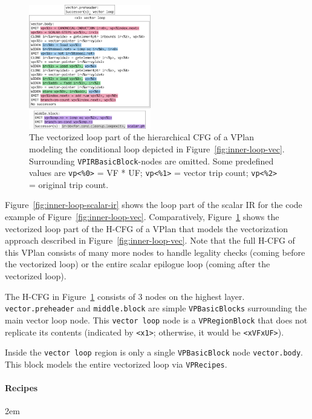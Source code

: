 \documentclass[sigplan,11pt,nonacm]{acmart}
\begin{document}
\begin{figure}
  \centering
  \includegraphics[width=0.475\textwidth]{images/inner-loop-vplan-hcfg-loop-body-color.png}
  \caption{The vectorized loop part of the hierarchical CFG of a VPlan modeling the 
  conditional loop depicted in Figure~\ref{fig:inner-loop-vec}. 
  Surrounding \texttt{VPIRBasicBlock}-nodes are omitted.
  Some predefined values are
  \texttt{vp<\%0>} = VF * UF; \texttt{vp<\%1>} = vector trip count; \texttt{vp<\%2>} = original trip count.}
  \label{fig:inner-loop-vplan-hcfg-body}
\end{figure}

Figure~\ref{fig:inner-loop-scalar-ir} shows the loop part of the scalar IR for the code example
of Figure~\ref{fig:inner-loop-vec}. Comparatively, Figure~\ref{fig:inner-loop-vplan-hcfg-body}
shows the vectorized loop part of the H-CFG of a VPlan that models the vectorization approach described
in Figure~\ref{fig:inner-loop-vec}. Note that the full H-CFG of this VPlan consists of many more nodes 
to handle legality checks (coming before the vectorized loop) or the entire scalar epilogue loop 
(coming after the vectorized loop).

The H-CFG in Figure~\ref{fig:inner-loop-vplan-hcfg-body} consists of 3 nodes on the highest layer. 
\texttt{vector.preheader} and \texttt{middle.block} 
are simple \texttt{VPBasicBlocks} surrounding the main vector loop node. This \texttt{vector loop} node 
is a \texttt{VPRegionBlock} that does 
not replicate its contents (indicated by \texttt{<x1>}; otherwise, it would be \texttt{<xVFxUF>}).

Inside the \texttt{vector loop} region is only a single \texttt{VPBasicBlock} node \texttt{vector.body}. This block 
models the entire vectorized loop via \texttt{VPRecipes}.

\paragraph{Recipes}
\emergencystretch 2em
\end{document}
